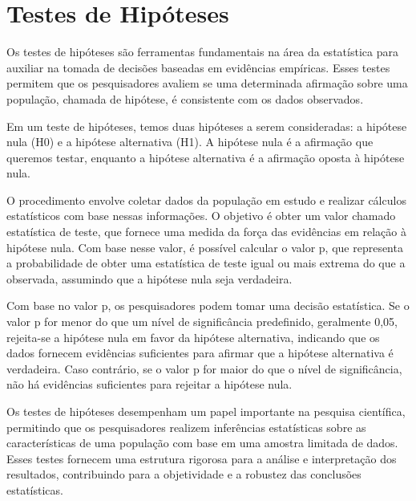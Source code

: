 \chapter{Testes de Hipóteses}

Os testes de hipóteses são ferramentas fundamentais na área da estatística para auxiliar na tomada de decisões baseadas em evidências empíricas. Esses testes permitem que os pesquisadores avaliem se uma determinada afirmação sobre uma população, chamada de hipótese, é consistente com os dados observados.

Em um teste de hipóteses, temos duas hipóteses a serem consideradas: a hipótese nula (H0) e a hipótese alternativa (H1). A hipótese nula é a afirmação que queremos testar, enquanto a hipótese alternativa é a afirmação oposta à hipótese nula.

O procedimento envolve coletar dados da população em estudo e realizar cálculos estatísticos com base nessas informações. O objetivo é obter um valor chamado estatística de teste, que fornece uma medida da força das evidências em relação à hipótese nula. Com base nesse valor, é possível calcular o valor p, que representa a probabilidade de obter uma estatística de teste igual ou mais extrema do que a observada, assumindo que a hipótese nula seja verdadeira.

Com base no valor p, os pesquisadores podem tomar uma decisão estatística. Se o valor p for menor do que um nível de significância predefinido, geralmente 0,05, rejeita-se a hipótese nula em favor da hipótese alternativa, indicando que os dados fornecem evidências suficientes para afirmar que a hipótese alternativa é verdadeira. Caso contrário, se o valor p for maior do que o nível de significância, não há evidências suficientes para rejeitar a hipótese nula.

Os testes de hipóteses desempenham um papel importante na pesquisa científica, permitindo que os pesquisadores realizem inferências estatísticas sobre as características de uma população com base em uma amostra limitada de dados. Esses testes fornecem uma estrutura rigorosa para a análise e interpretação dos resultados, contribuindo para a objetividade e a robustez das conclusões estatísticas.